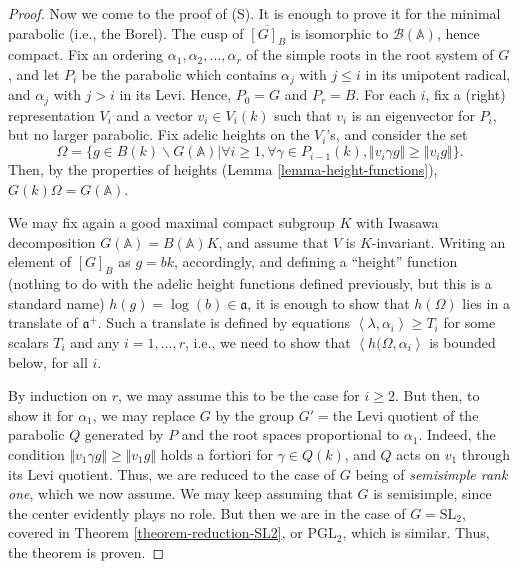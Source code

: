 \begin{proof}
 
Now we come to the proof of (S). It is enough to prove it for the minimal parabolic (i.e., the Borel). The cusp of $\overline{[G]_B}$ is isomorphic to $\mathcal B(\mathbb A)$, hence compact. Fix an ordering $\alpha_1, \alpha_2, \dots,\alpha_r$ of the simple roots in the root system of $G$, and let $P_i$ be the parabolic which contains $\alpha_j$ with $j\le i$ in its unipotent radical, and $\alpha_j$ with $j>i$ in its Levi. Hence, $P_0=G$ and $P_r=B$. For each $i$, fix a (right) representation $V_i$ and a vector $v_i \in V_i(k)$ such that $v_i$ is an eigenvector for $P_i$, but no larger parabolic. Fix adelic heights on the $V_i$'s, and consider the set 
 $$ \Omega = \{g \in B(k)\backslash G(\mathbb A) | \forall i \ge 1, \forall \gamma \in P_{i-1}(k), \Vert v_i \gamma g \Vert \ge \Vert  v_i g\Vert\}.$$
 Then, by the properties of heights (Lemma \ref{lemma-height-functions}), $G(k)\Omega = G(\mathbb A)$. 
 
 We may fix again a good maximal compact subgroup $K$ with Iwasawa decomposition $G(\mathbb A) = B(\mathbb A)K$, and assume that $V$ is $K$-invariant. Writing an element of $[G]_B$ as $g=bk$, accordingly, and defining a ``height'' function (nothing to do with the adelic height functions defined previously, but this is a standard name) $h(g) = \log(b)\in \mathfrak a$, it is enough to show that $h(\Omega)$ lies in a translate of $\mathfrak a^+$. Such a translate is defined by equations $\left < \lambda, \alpha_i\right> \ge T_i$ for some scalars $T_i$ and any $i=1,\dots ,r$, i.e., we need to show that $\left< h(\Omega, \alpha_i\right>$ is bounded below, for all $i$. 
 
 By induction on $r$, we may assume this to be the case for $i \ge 2$. But then, to show it for $\alpha_1$, we may replace $G$ by the group $G'=$the Levi quotient of the parabolic $Q$ generated by $P$ and the root spaces proportional to $\alpha_1$. Indeed, the condition $\Vert v_1 \gamma g \Vert \ge \Vert v_1 g\Vert$ holds a fortiori for $\gamma \in Q (k)$, and $Q$ acts on $v_1$ through its Levi quotient. Thus, we are reduced to the case of $G$ being of \emph{semisimple rank one}, which we now assume. We may keep assuming that $G$ is semisimple, since the center evidently plays no role. But then we are in the case of $G = \text{SL}_2$, covered in Theorem \ref{theorem-reduction-SL2}, or $\text{PGL}_2$, which is similar. Thus, the theorem is proven. 
\end{proof}

